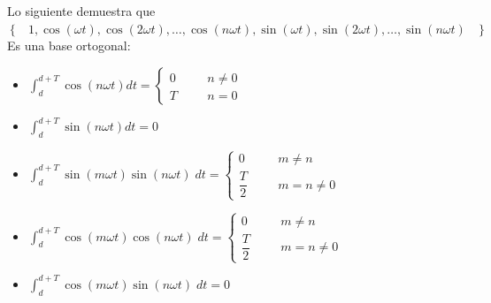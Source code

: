 \documentclass[12pt, fleqn]{report}                             %
\DeclareMathOperator \Space {\quad}                             %
\DeclareMathOperator \MiniSpace {\;}                            %
\newcommand{\Set}[1]{\left\{ \MiniSpace #1 \MiniSpace \right\}} %
\newcommand{\Wrap}[1]{\left( #1 \right)}                        %
\newcommand{\Cos}[1]{\cos\Wrap{#1}}                             %
\newcommand{\Sin}[1]{\sin\Wrap{#1}}                             %
\begin{document}
            Lo siguiente demuestra que $\Set{1, \Cos{\omega t}, \Cos{2 \omega t}, \dots,
            \Cos{n \omega t}, \Sin{\omega t}, \Sin{2 \omega t}, \dots, \Sin{n \omega t}}$
            Es una base ortogonal:
            \begin{itemize}
                \item
                    ${\displaystyle
                    \int_d^{d+T} \Cos{n \omega t} dt = 
                    \begin{cases}
                        0 &\Space n \neq 0  \\
                        T &\Space n = 0
                    \end{cases}
                    }$

                \item
                    ${\displaystyle
                    \int_d^{d+T} \Sin{n \omega t} dt = 0
                    }$

                \item
                    ${\displaystyle
                    \int_d^{d+T} \Sin{m \omega t} \Sin{n \omega t} \; dt =
                    \begin{cases}
                        0               &\Space m \neq n  \\
                        \dfrac{T}{2}    &\Space m = n \neq 0
                    \end{cases}
                    }$

                \item
                    ${\displaystyle
                    \int_d^{d+T} \Cos{m \omega t} \Cos{n \omega t} \; dt =
                    \begin{cases}
                        0               &\Space m \neq n  \\
                        \dfrac{T}{2}    &\Space m = n \neq 0
                    \end{cases}
                    }$

                \item
                    ${\displaystyle
                    \int_d^{d+T} \Cos{m \omega t} \Sin{n \omega t} \; dt =
                    0
                    }$
            \end{itemize}


                      

        \clearpage
\end{document}
